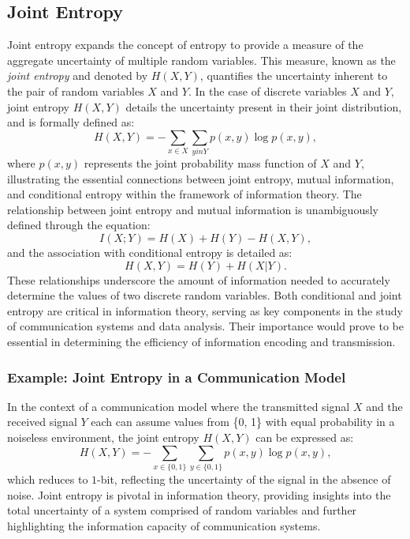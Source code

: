 \documentclass[journal,12pt,onecolumn,draftclsnofoot,]{IEEEtran}
\begin{document}
	\subsection{Joint Entropy}
	Joint entropy expands the concept of entropy to provide a measure of the aggregate uncertainty of multiple random variables. This measure, known as the \emph{joint entropy} and denoted by \(H(X, Y)\), quantifies the uncertainty inherent to the pair of random variables \(X\) and \(Y\). In the case of discrete variables \(X\) and \(Y\), joint entropy \(H(X, Y)\) details the uncertainty present in their joint distribution, and is formally defined as:
	\begin{equation}
		H(X, Y) = -\sum_{x \in X}\sum_{y in Y} p(x, y) \log p(x, y),
	\end{equation}
	where \(p(x, y)\) represents the joint probability mass function of \(X\) and \(Y\), illustrating the essential connections between joint entropy, mutual information, and conditional entropy within the framework of information theory. The relationship between joint entropy and mutual information is unambiguously defined through the equation:
	\begin{equation}
		I(X; Y) = H(X) + H(Y) - H(X, Y),
	\end{equation}
	and the association with conditional entropy is detailed as:
	\begin{equation}
		H(X, Y) = H(Y) + H(X|Y).
	\end{equation}
	These relationships underscore the amount of information needed to accurately determine the values of two discrete random variables. Both conditional and joint entropy are critical in information theory, serving as key components in the study of communication systems and data analysis. Their importance would prove to be essential in determining the efficiency of information encoding and transmission.
	
	\subsubsection*{Example: Joint Entropy in a Communication Model}
	In the context of a communication model where the transmitted signal \(X\) and the received signal \(Y\) each can assume values from \{0, 1\} with equal probability in a noiseless environment, the joint entropy \(H(X, Y)\) can be expressed as:
	\begin{equation}
		H(X, Y) = -\sum_{x \in \{0,1\}}\sum_{y \in \{0,1\}} p(x, y) \log p(x, y),
	\end{equation}
	which reduces to \(1\)-bit, reflecting the uncertainty of the signal in the absence of noise. Joint entropy is pivotal in information theory, providing insights into the total uncertainty of a system comprised of random variables and further highlighting the information capacity of communication systems.
	
\end{document}
